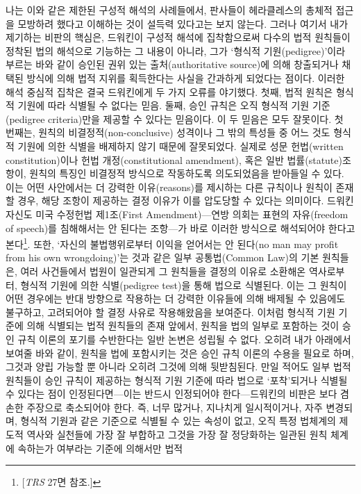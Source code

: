 나는 이와 같은 제한된 구성적 해석의 사례들에서, 판사들이 헤라클레스의
총체적 접근을 모방하려 했다고 이해하는 것이 설득력 있다고는 보지 않는다.
그러나 여기서 내가 제기하는 비판의 핵심은, 드워킨이 구성적 해석에
집착함으로써 다수의 법적 원칙들이 정착된 법의 해석으로 기능하는 그
내용이 아니라, 그가 `형식적 기원(pedigree)'이라 부르는 바와 같이 승인된
권위 있는 출처(authoritative source)에 의해 창출되거나 채택된 방식에
의해 법적 지위를 획득한다는 사실을 간과하게 되었다는 점이다. 이러한 해석
중심적 집착은 결국 드워킨에게 두 가지 오류를 야기했다. 첫째, 법적 원칙은
형식적 기원에 따라 식별될 수 없다는 믿음. 둘째, 승인 규칙은 오직 형식적
기원 기준(pedigree criteria)만을 제공할 수 있다는 믿음이다. 이 두 믿음은
모두 잘못이다. 첫 번째는, 원칙의 비결정적(non-conclusive) 성격이나 그
밖의 특성들 중 어느 것도 형식적 기원에 의한 식별을 배제하지 않기 때문에
잘못되었다. 실제로 성문 헌법(written constitution)이나 헌법
개정(constitutional amendment), 혹은 일반 법률(statute)조항이, 원칙의
특징인 비결정적 방식으로 작동하도록 의도되었음을 받아들일 수 있다. 이는
어떤 사안에서는 더 강력한 이유(reasons)를 제시하는 다른 규칙이나 원칙이
존재할 경우, 해당 조항이 제공하는 결정 이유가 이를 압도당할 수 있다는
의미이다. 드워킨 자신도 미국 수정헌법 제1조(First Amendment)---연방
의회는 표현의 자유(freedom of speech)를 침해해서는 안 된다는 조항---가
바로 이러한 방식으로 해석되어야 한다고 본다\footnote{{[}\emph{TRS} 27면
  참조.{]}}. 또한, `자신의 불법행위로부터 이익을 얻어서는 안 된다(no man
may profit from his own wrongdoing)'는 것과 같은 일부 공통법(Common
Law)의 기본 원칙들은, 여러 사건들에서 법원이 일관되게 그 원칙들을 결정의
이유로 소환해온 역사로부터, 형식적 기원에 의한 식별(pedigree test)을
통해 법으로 식별된다. 이는 그 원칙이 어떤 경우에는 반대 방향으로
작용하는 더 강력한 이유들에 의해 배제될 수 있음에도 불구하고, 고려되어야
할 결정 사유로 작용해왔음을 보여준다. 이처럼 형식적 기원 기준에 의해
식별되는 법적 원칙들의 존재 앞에서, 원칙을 법의 일부로 포함하는 것이
승인 규칙 이론의 포기를 수반한다는 일반 논변은 성립될 수 없다. 오히려
내가 아래에서 보여줄 바와 같이, 원칙을 법에 포함시키는 것은 승인 규칙
이론의 수용을 필요로 하며, 그것과 양립 가능할 뿐 아니라 오히려 그것에
의해 뒷받침된다. 만일 적어도 일부 법적 원칙들이 승인 규칙이 제공하는
형식적 기원 기준에 따라 법으로 `포착'되거나 식별될 수 있다는 점이
인정된다면---이는 반드시 인정되어야 한다---드워킨의 비판은 보다 겸손한
주장으로 축소되어야 한다. 즉, 너무 많거나, 지나치게 일시적이거나, 자주
변경되며, 형식적 기원과 같은 기준으로 식별될 수 있는 속성이 없고, 오직
특정 법체계의 제도적 역사와 실천들에 가장 잘 부합하고 그것을 가장 잘
정당화하는 일관된 원칙 체계에 속하는가 여부라는 기준에 의해서만 법적

